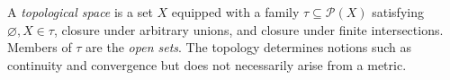 
A \emph{topological space} is a set $X$ equipped with a family $\tau\subseteq\mathcal P(X)$ satisfying $\varnothing,X\in\tau$, closure under arbitrary unions, and closure under finite intersections. Members of $\tau$ are the \emph{open sets}. The topology determines notions such as continuity and convergence but does not necessarily arise from a metric.
